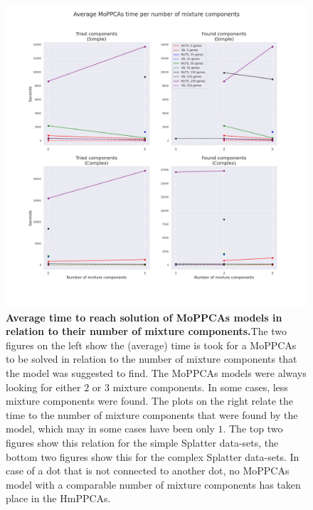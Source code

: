 \begin{figure}
    \centering
    \includegraphics[width=\linewidth]{figs/time_mixture_comps.png}
    \caption[Average time to reach solution of MoPPCAs models in relation to their number of mixture components.]{\textbf{Average time to reach solution of MoPPCAs models in relation to their number of mixture components.}The two figures on the left show the (average) time is took for a MoPPCAs to be solved in relation to the number of mixture components that the model was suggested to find. The MoPPCAs models were always looking for either $2$ or $3$ mixture components. In some cases, less mixture components were found. The plots on the right relate the time to the number of mixture components that were found by the model, which may in some cases have been only $1$. The top two figures show this relation for the simple Splatter data-sets, the bottom two figures show this for the complex Splatter data-sets. In case of a dot that is not connected to another dot, no MoPPCAs model with a comparable number of mixture components has taken place in the HmPPCAs.}
    \label{fig:time_comps}
\end{figure}




